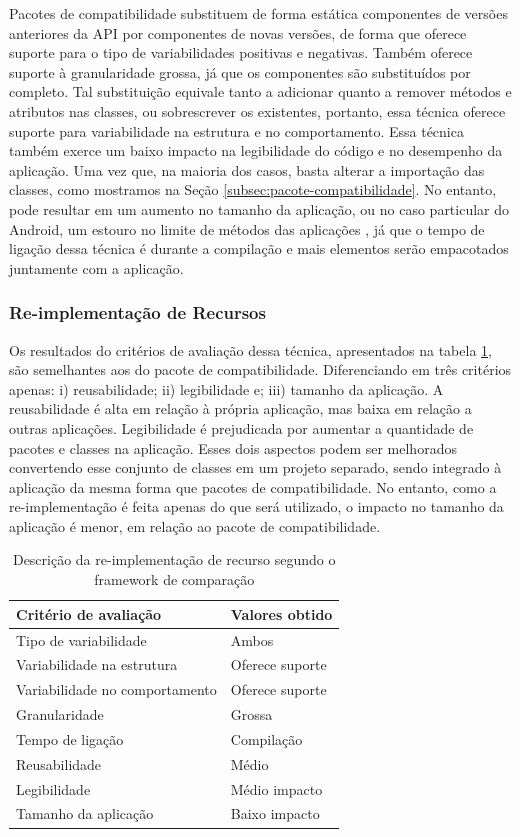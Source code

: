 Pacotes de compatibilidade substituem de forma estática componentes de versões
anteriores da API por componentes de novas versões, de forma que oferece suporte
para o tipo de variabilidades positivas e negativas. Também oferece suporte à
granularidade grossa, já que os componentes são substituídos por completo. Tal
substituição equivale tanto a adicionar quanto a remover métodos e atributos nas
classes, ou sobrescrever os existentes, portanto, essa técnica oferece suporte para
variabilidade na estrutura e no comportamento. Essa técnica também exerce um baixo
impacto na legibilidade do código e no desempenho da aplicação. Uma vez que, na maioria
dos casos, basta alterar a importação das classes, como mostramos  na Seção \ref{subsec:pacote-compatibilidade}.
No entanto, pode resultar em um aumento no tamanho
da aplicação, ou no caso particular do Android, um estouro no limite de métodos das
aplicações \cite{Estouro}, já que o tempo de ligação dessa técnica é durante a compilação
e mais elementos serão empacotados juntamente com a aplicação.

\subsubsection{Re-implementação de Recursos}
Os resultados do critérios de avaliação dessa técnica, apresentados na tabela
\ref{tab:fw_reimplementacao}, são semelhantes aos do pacote de compatibilidade.
Diferenciando em três critérios apenas: i) reusabilidade; ii) legibilidade e;
iii) tamanho da aplicação. A reusabilidade é alta em relação à própria aplicação,
mas baixa em relação a outras aplicações. Legibilidade é prejudicada por aumentar
a quantidade de pacotes e classes na aplicação. Esses dois aspectos podem ser
melhorados convertendo esse conjunto de classes em um projeto separado, sendo
integrado à aplicação da mesma forma que pacotes de compatibilidade. No entanto,
como a re-implementação é feita apenas do que será utilizado, o impacto no tamanho
da aplicação é menor, em relação ao pacote de compatibilidade. 

\begin{table}[!htbp]
  \centering	
  \caption{Descrição da re-implementação de recurso segundo o framework de comparação}
  \label{tab:fw_reimplementacao}
  \begin{tabular}{ | l | l |}
    \hline
    \textbf{Critério de avaliação} 	& \textbf{Valores obtido}  \\ \hline
    Tipo de variabilidade 			& Ambos  \\ \hline
    Variabilidade na estrutura 		& Oferece suporte \\ \hline
    Variabilidade no comportamento 	& Oferece suporte \\ \hline
    Granularidade 					& Grossa \\ \hline
    Tempo de ligação 				& Compilação \\ \hline
    Reusabilidade 					& Médio \\ \hline
    Legibilidade 					& Médio impacto \\ \hline
    Tamanho da aplicação 			& Baixo impacto \\ \hline
  \end{tabular}
\end{table}

